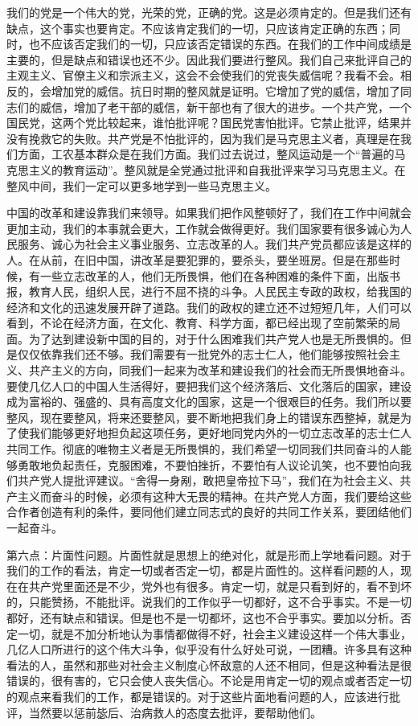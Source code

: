 我们的党是一个伟大的党，光荣的党，正确的党。这是必须肯定的。但是我们还有缺点，这个事实也要肯定。不应该肯定我们的一切，只应该肯定正确的东西；同时，也不应该否定我们的一切，只应该否定错误的东西。在我们的工作中间成绩是主要的，但是缺点和错误也还不少。因此我们要进行整风。我们自己来批评自己的主观主义、官僚主义和宗派主义，这会不会使我们的党丧失威信呢？我看不会。相反的，会增加党的威信。抗日时期的整风就是证明。它增加了党的威信，增加了同志们的威信，增加了老干部的威信，新干部也有了很大的进步。一个共产党，一个国民党，这两个党比较起来，谁怕批评呢？国民党害怕批评。它禁止批评，结果并没有挽救它的失败。共产党是不怕批评的，因为我们是马克思主义者，真理是在我们方面，工农基本群众是在我们方面。我们过去说过，整风运动是一个“普遍的马克思主义的教育运动”。整风就是全党通过批评和自我批评来学习马克思主义。在整风中间，我们一定可以更多地学到一些马克思主义。

中国的改革和建设靠我们来领导。如果我们把作风整顿好了，我们在工作中间就会更加主动，我们的本事就会更大，工作就会做得更好。我们国家要有很多诚心为人民服务、诚心为社会主义事业服务、立志改革的人。我们共产党员都应该是这样的人。在从前，在旧中国，讲改革是要犯罪的，要杀头，要坐班房。但是在那些时候，有一些立志改革的人，他们无所畏惧，他们在各种困难的条件下面，出版书报，教育人民，组织人民，进行不屈不挠的斗争。人民民主专政的政权，给我国的经济和文化的迅速发展开辟了道路。我们的政权的建立还不过短短几年，人们可以看到，不论在经济方面，在文化、教育、科学方面，都已经出现了空前繁荣的局面。为了达到建设新中国的目的，对于什么困难我们共产党人也是无所畏惧的。但是仅仅依靠我们还不够。我们需要有一批党外的志士仁人，他们能够按照社会主义、共产主义的方向，同我们一起来为改革和建设我们的社会而无所畏惧地奋斗。要使几亿人口的中国人生活得好，要把我们这个经济落后、文化落后的国家，建设成为富裕的、强盛的、具有高度文化的国家，这是一个很艰巨的任务。我们所以要整风，现在要整风，将来还要整风，要不断地把我们身上的错误东西整掉，就是为了使我们能够更好地担负起这项任务，更好地同党内外的一切立志改革的志士仁人共同工作。彻底的唯物主义者是无所畏惧的，我们希望一切同我们共同奋斗的人能够勇敢地负起责任，克服困难，不要怕挫折，不要怕有人议论讥笑，也不要怕向我们共产党人提批评建议。“舍得一身剐，敢把皇帝拉下马”，我们在为社会主义、共产主义而奋斗的时候，必须有这种大无畏的精神。在共产党人方面，我们要给这些合作者创造有利的条件，要同他们建立同志式的良好的共同工作关系，要团结他们一起奋斗。

第六点：片面性问题。片面性就是思想上的绝对化，就是形而上学地看问题。对于我们的工作的看法，肯定一切或者否定一切，都是片面性的。这样看问题的人，现在在共产党里面还是不少，党外也有很多。肯定一切，就是只看到好的，看不到坏的，只能赞扬，不能批评。说我们的工作似乎一切都好，这不合乎事实。不是一切都好，还有缺点和错误。但是也不是一切都坏，这也不合乎事实。要加以分析。否定一切，就是不加分析地认为事情都做得不好，社会主义建设这样一个伟大事业，几亿人口所进行的这个伟大斗争，似乎没有什么好处可说，一团糟。许多具有这种看法的人，虽然和那些对社会主义制度心怀敌意的人还不相同，但是这种看法是很错误的，很有害的，它只会使人丧失信心。不论是用肯定一切的观点或者否定一切的观点来看我们的工作，都是错误的。对于这些片面地看问题的人，应该进行批评，当然要以惩前毖后、治病救人的态度去批评，要帮助他们。


